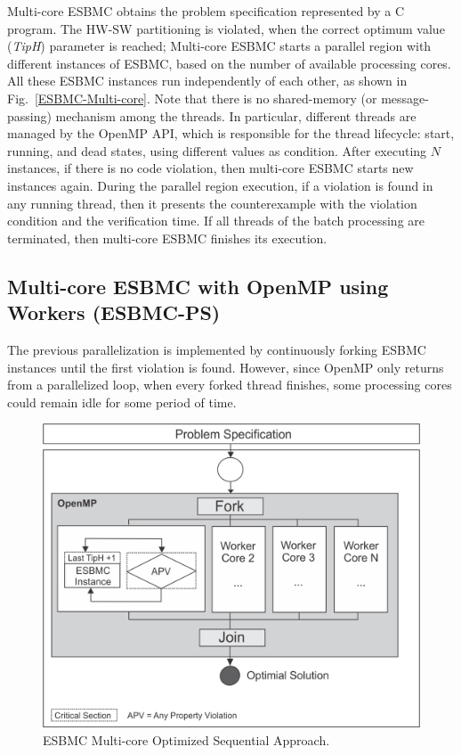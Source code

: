 Multi-core ESBMC obtains the problem specification represented by a C program. The HW-SW partitioning is violated, when the correct optimum value (\textit{TipH}) parameter is reached; Multi-core ESBMC starts a parallel region with different instances of ESBMC, based on the number of available processing cores. All these ESBMC instances run independently of each other, as shown in Fig.~\ref{ESBMC-Multi-core}. Note that there is no shared-memory (or message-passing) mechanism among the threads. In particular, different threads are managed by the OpenMP API, which is responsible for the thread lifecycle: start, running, and dead states, using different values as condition. After executing $N$ instances, if there is no code violation, then multi-core ESBMC starts new instances again. During the parallel region execution, if a violation is found in any running thread, then it presents the counterexample with the violation condition and the verification time. If all threads of the batch processing are terminated, then multi-core ESBMC finishes its execution.

\subsection{Multi-core ESBMC with OpenMP using Workers (ESBMC-PS)}
\label{Multi-core-ESBMC-with-OpenMP-using-workers}

The previous parallelization is implemented by continuously forking ESBMC instances until the first violation is found. However, since OpenMP only returns from a parallelized loop, when every forked thread finishes, some processing cores could remain idle for some period of time.

\begin{figure}[ht]
	\centering
  \includegraphics[scale=0.75]{Image/esbmc-parallel.png} 
	\caption{ESBMC Multi-core Optimized Sequential Approach. }
	\label{ESBMC-Multi-core-Optimized-Sequential-Approach}
\end{figure}

